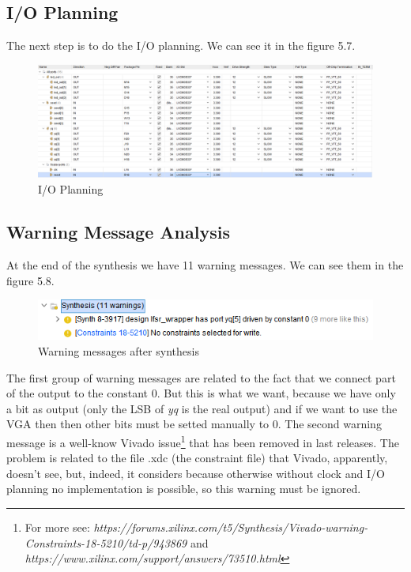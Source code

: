 \documentclass[a4paper]{report}
\begin{document}
\subsection{I/O Planning}
The next step is to do the I/O planning. We can see it in the figure 5.7.
\begin{figure}[htpb]
	\centering
	\includegraphics[scale=0.4]{img/vivado/ioplanning.png}
	\caption{I/O Planning}%
\end{figure}


\subsection{Warning Message Analysis}
At the end of the synthesis we have 11 warning messages. We can see them in the figure 5.8.


\begin{figure}[htpb]
	\centering
	\includegraphics[scale=0.8]{img/vivado/warnings_synthesis.png}
	\caption{Warning messages after synthesis}
\end{figure}

\noindent The first group of warning messages are related to the fact that we connect part of the output to the constant 0. But this is what we want, because we have only a bit as output (only the LSB of \emph{yq} is the real output) and if we want to use the VGA then then other bits must be setted manually to 0. The second warning message is a well-know Vivado issue\footnote{ For more see: \emph{https://forums.xilinx.com/t5/Synthesis/Vivado-warning-Constraints-18-5210/td-p/943869} and \emph{https://www.xilinx.com/support/answers/73510.html}}
that has been removed in last releases. The problem is related to the file .xdc (the constraint file) that Vivado, apparently, doesn't see, but, indeed, it considers because otherwise without clock and I/O planning no implementation is possible, so this warning must be ignored. 
\end{document}
